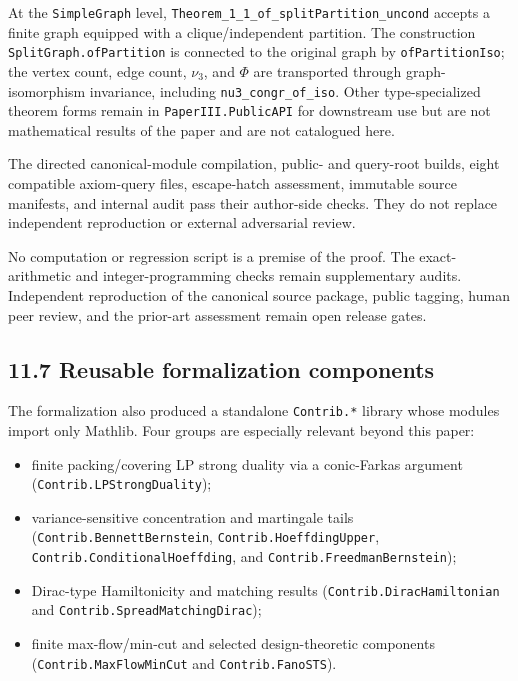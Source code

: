 \documentclass[
  american,
  11pt,
  a4paper,
]{article}
\providecommand{\tightlist}{%
  \setlength{\itemsep}{0pt}\setlength{\parskip}{0pt}}
\begin{document}
At the \texttt{SimpleGraph} level, \texttt{Theorem\_1\_1\_of\_splitPartition\_uncond} accepts a finite graph equipped with a clique/independent partition. The construction \texttt{SplitGraph.ofPartition} is connected to the original graph by \texttt{ofPartitionIso}; the vertex count, edge count, \(\nu_3\), and \(\Phi\) are transported through graph-isomorphism invariance, including \texttt{nu3\_congr\_of\_iso}. Other type-specialized theorem forms remain in \texttt{PaperIII.PublicAPI} for downstream use but are not mathematical results of the paper and are not catalogued here.

The directed canonical-module compilation, public- and query-root builds, eight compatible axiom-query files, escape-hatch assessment, immutable source manifests, and internal audit pass their author-side checks. They do not replace independent reproduction or external adversarial review.

No computation or regression script is a premise of the proof. The exact-arithmetic and integer-programming checks remain supplementary audits. Independent reproduction of the canonical source package, public tagging, human peer review, and the prior-art assessment remain open release gates.

\subsection{11.7 Reusable formalization components}\label{reusable-formalization-components}

The formalization also produced a standalone \texttt{Contrib.*} library whose modules import only Mathlib. Four groups are especially relevant beyond this paper:

\begin{itemize}
\tightlist
\item
  finite packing/covering LP strong duality via a conic-Farkas argument (\texttt{Contrib.LPStrongDuality});
\item
  variance-sensitive concentration and martingale tails (\texttt{Contrib.BennettBernstein}, \texttt{Contrib.HoeffdingUpper}, \texttt{Contrib.ConditionalHoeffding}, and \texttt{Contrib.FreedmanBernstein});
\item
  Dirac-type Hamiltonicity and matching results (\texttt{Contrib.DiracHamiltonian} and \texttt{Contrib.SpreadMatchingDirac});
\item
  finite max-flow/min-cut and selected design-theoretic components (\texttt{Contrib.MaxFlowMinCut} and \texttt{Contrib.FanoSTS}).
\end{itemize}
\end{document}

